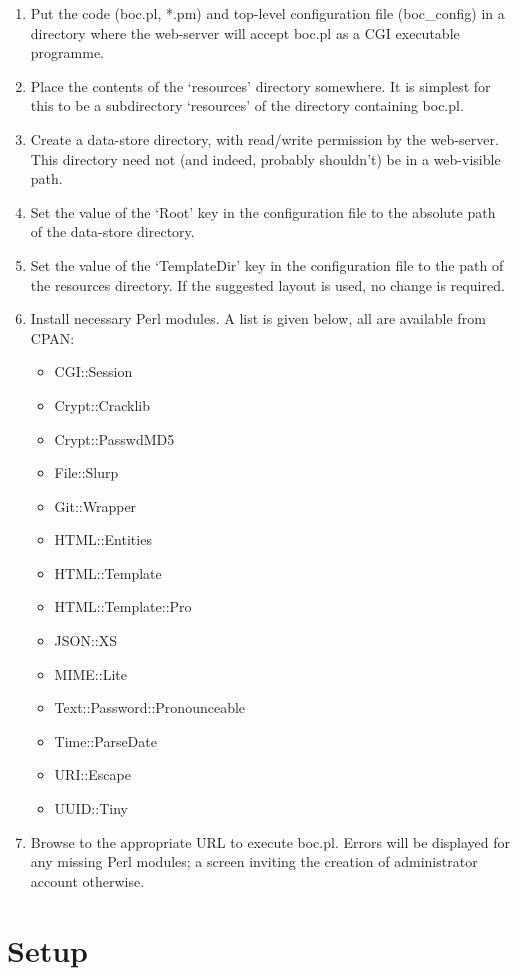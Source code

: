 \documentclass{report}
\begin{document}
\begin{enumerate}
\item Put the code (boc.pl, *.pm) and top-level configuration file (boc\_config) in a directory where the web-server will accept boc.pl as a CGI executable programme.
\item Place the contents of the `resources' directory somewhere.  It is simplest for this to be a subdirectory `resources' of the directory containing boc.pl.
\item Create a data-store directory, with read/write permission by the web-server.  This directory need not (and indeed, probably shouldn't) be in a web-visible path.
\item Set the value of the `Root' key in the configuration file to the absolute path of the data-store directory.
\item Set the value of the `TemplateDir' key in the configuration file to the path of the resources directory.  If the suggested layout is used, no change is required.
\item Install necessary Perl modules.  A list is given below, all are available from CPAN:
	\begin{itemize}
	\item CGI::Session
	\item Crypt::Cracklib
	\item Crypt::PasswdMD5
	\item File::Slurp
	\item Git::Wrapper
	\item HTML::Entities
	\item HTML::Template
	\item HTML::Template::Pro
	\item JSON::XS
	\item MIME::Lite
	\item Text::Password::Pronounceable
	\item Time::ParseDate
	\item URI::Escape
	\item UUID::Tiny
	\end{itemize}
\item Browse to the appropriate URL to execute boc.pl.  Errors will be displayed for any missing Perl modules; a screen inviting the creation of administrator account otherwise.
\end{enumerate}

\section{Setup}
\end{document}
